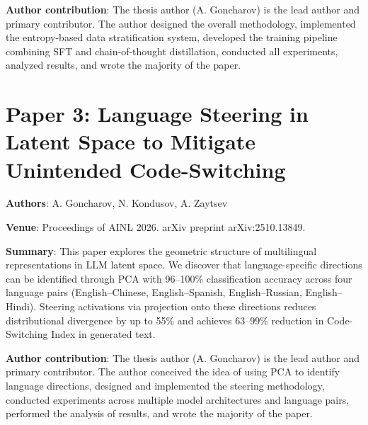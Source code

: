 \textbf{Author contribution}: The thesis author (A. Goncharov) is the lead author and primary contributor. The author designed the overall methodology, implemented the entropy-based data stratification system, developed the training pipeline combining SFT and chain-of-thought distillation, conducted all experiments, analyzed results, and wrote the majority of the paper.

\section*{Paper 3: Language Steering in Latent Space to Mitigate Unintended Code-Switching}

\textbf{Authors}: A. Goncharov, N. Kondusov, A. Zaytsev

\textbf{Venue}: Proceedings of AINL 2026. arXiv preprint arXiv:2510.13849.

\textbf{Summary}: This paper explores the geometric structure of multilingual representations in LLM latent space. We discover that language-specific directions can be identified through PCA with 96--100\% classification accuracy across four language pairs (English--Chinese, English--Spanish, English--Russian, English--Hindi). Steering activations via projection onto these directions reduces distributional divergence by up to 55\% and achieves 63--99\% reduction in Code-Switching Index in generated text.

\textbf{Author contribution}: The thesis author (A. Goncharov) is the lead author and primary contributor. The author conceived the idea of using PCA to identify language directions, designed and implemented the steering methodology, conducted experiments across multiple model architectures and language pairs, performed the analysis of results, and wrote the majority of the paper.
